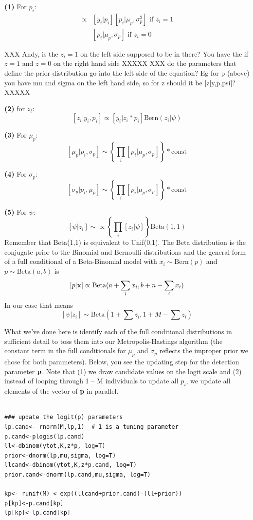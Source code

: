 {\bf (1)} For $p_{i}$:
\begin{eqnarray*}
[p_{i}|y_{i}, \mu_p, \sigma_{p},z_{i}=1] &\propto  &
[y_{i}|p_{i}][p_{i}|\mu_p,\sigma_{p}^{2}] \mbox{ if $z_{i}=1$ }  \\
                 &  &  [p_{i}|\mu_p,\sigma_{p}] \mbox{ if $z_{i}=0$ }
\end{eqnarray*}

XXX Andy, is the $z_i = 1$ on the left side supposed to be in there? You have the if $z=1$ and $z=0$ on the right hand side XXXXX
XXX do the parameters that define the prior distribution go into the left side of the equation? Eg for p (above) you have mu and sigma on the left hand side,
so for z should it be [z|y,p,psi]? XXXXX

{\bf (2)} for $z_{i}$:
\[
[z_{i} | y_{i}, p_{i}] \propto [y_{i}|z_{i}*p_{i}] \mbox{Bern}(z_{i}|\psi)
\]

{\bf (3)} For $\mu_{p}$:
\[
[\mu_{p} | p_{i}, \sigma_{p}] \sim \left\{ \prod_{i} [p_{i}|\mu_{p}, \sigma_{p}] \right\} *\mbox{const}
\]


{\bf (4)} For $\sigma_{p}$:
\[
[ \sigma_{p}|p_{i}, \mu_{p} ] \sim \left\{ \prod_{i}[p_{i}| \mu_{p},\sigma_{p} ] \right\} *\mbox{const}
\]

{\bf (5)} For $\psi$:
\[
[\psi|z_{i}] \sim \propto \left\{ \prod_{i} [z_{i}|\psi] \right\} \mbox{Beta}(1,1)
\]
Remember that \mbox{Beta}(1,1) is equivalent to \mbox{Unif}(0,1). The Beta distribution is the conjugate prior to the Binomial and 
Bernoulli distributions and the general form of a full conditional of a Beta-Binomial model 
with $x_{i} \sim \mbox{Bern} (p) $ and $p \sim \mbox{Beta}(a,b)$ is
\[
[p|{\bf x}] \propto \mbox{Beta}(a + \sum_i x_i, b + n-\sum_i x_i)
\]
In our case that means
\[
[\psi|z_{i}] \sim \mbox{Beta}(1 + \sum z_{i}, 1 + M - \sum z_{i})
\]

What we've done here is identify each of the full conditional
distributions in sufficient detail to toss them into our
Metropolis-Hastings algorithm (the constant term in the full conditionals for $\mu_{p}$ and $\sigma_{p}$ reflects the improper prior we chose for both parameters). 
Below, you see the updating step for the detection parameter ${\bf p}$. Note that (1) we draw candidate values on the logit scale and (2) instead of looping through 1 -- M individuals to update all $p_{i}$, we update all elements of the vector of {\bf p} in parallel.   

\begin{verbatim}

### update the logit(p) parameters
lp.cand<- rnorm(M,lp,1)  # 1 is a tuning parameter
p.cand<-plogis(lp.cand)
ll<-dbinom(ytot,K,z*p, log=T)
prior<-dnorm(lp,mu,sigma, log=T)
llcand<-dbinom(ytot,K,z*p.cand, log=T)
prior.cand<-dnorm(lp.cand,mu,sigma, log=T)

kp<- runif(M) < exp((llcand+prior.cand)-(ll+prior))
p[kp]<-p.cand[kp]
lp[kp]<-lp.cand[kp]

\end{verbatim}

